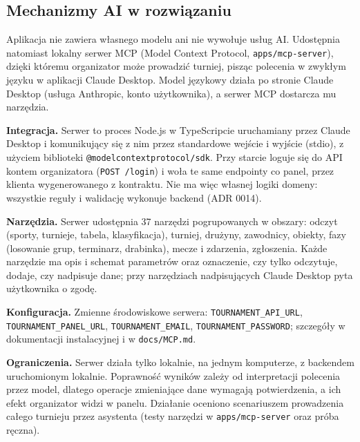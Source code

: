 \documentclass[11pt,a4paper,oneside]{article}
\newif\ifpodpowiedzi
\newcommand{\podpowiedz}[1]{\ifpodpowiedzi\par\begingroup\small\color{hintcolor}\textit{Wskazówka: #1}\par\endgroup\fi}
\begin{document}
\newpage
\subsection{Mechanizmy AI w rozwiązaniu}
\podpowiedz{Ta podsekcja dotyczy AI stanowiącej część projektu. Opisz model lub usługę, wersję, zadanie, dane wejściowe i wyjściowe, integrację, konfigurację i ograniczenia. Jeśli rozwiązanie obejmuje uczenie, opisz dane, podział zbiorów, parametry i ocenę wyników. Dla usług zewnętrznych wskaż wymagane połączenia i zależności, bez ujawniania kluczy dostępowych. Jeśli AI tylko wspomagała pracę zespołu, jej wykorzystanie opisz w sprawozdaniu, a tę podsekcję usuń.}
Aplikacja nie zawiera własnego modelu ani nie wywołuje usług AI. Udostępnia natomiast lokalny serwer MCP (Model Context Protocol, \texttt{apps/mcp-server}), dzięki któremu organizator może prowadzić turniej, pisząc polecenia w zwykłym języku w aplikacji Claude Desktop. Model językowy działa po stronie Claude Desktop (usługa Anthropic, konto użytkownika), a serwer MCP dostarcza mu narzędzia.

\textbf{Integracja.} Serwer to proces Node.js w TypeScripcie uruchamiany przez Claude Desktop i komunikujący się z nim przez standardowe wejście i wyjście (stdio), z użyciem biblioteki \texttt{@modelcontextprotocol/sdk}. Przy starcie loguje się do API kontem organizatora (\texttt{POST /login}) i woła te same endpointy co panel, przez klienta wygenerowanego z kontraktu. Nie ma więc własnej logiki domeny: wszystkie reguły i walidację wykonuje backend (ADR 0014).

\textbf{Narzędzia.} Serwer udostępnia 37 narzędzi pogrupowanych w obszary: odczyt (sporty, turnieje, tabela, klasyfikacja), turniej, drużyny, zawodnicy, obiekty, fazy (losowanie grup, terminarz, drabinka), mecze i zdarzenia, zgłoszenia. Każde narzędzie ma opis i schemat parametrów oraz oznaczenie, czy tylko odczytuje, dodaje, czy nadpisuje dane; przy narzędziach nadpisujących Claude Desktop pyta użytkownika o zgodę.

\textbf{Konfiguracja.} Zmienne środowiskowe serwera: \texttt{TOURNAMENT\_API\_URL}, \texttt{TOURNAMENT\_PANEL\_URL}, \texttt{TOURNAMENT\_EMAIL}, \texttt{TOURNAMENT\_PASSWORD}; szczegóły w dokumentacji instalacyjnej i w \texttt{docs/MCP.md}.

\textbf{Ograniczenia.} Serwer działa tylko lokalnie, na jednym komputerze, z backendem uruchomionym lokalnie. Poprawność wyników zależy od interpretacji polecenia przez model, dlatego operacje zmieniające dane wymagają potwierdzenia, a ich efekt organizator widzi w panelu. Działanie oceniono scenariuszem prowadzenia całego turnieju przez asystenta (testy narzędzi w \texttt{apps/mcp-server} oraz próba ręczna).
\end{document}
